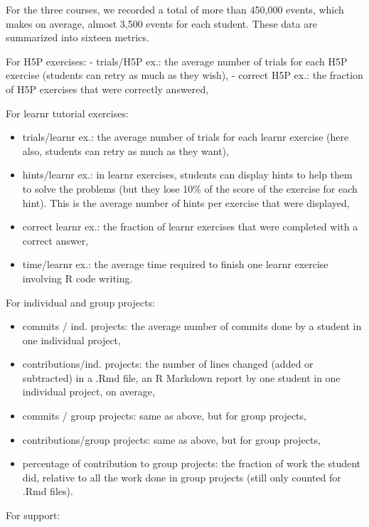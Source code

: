 \documentclass[
]{article}
\providecommand{\tightlist}{%
  \setlength{\itemsep}{0pt}\setlength{\parskip}{0pt}}
\begin{document}
For the three courses, we recorded a total of more than 450,000 events,
which makes on average, almost 3,500 events for each student. These data
are summarized into sixteen metrics.

For H5P exercises: - trials/H5P ex.: the average number of trials for
each H5P exercise (students can retry as much as they wish), - correct
H5P ex.: the fraction of H5P exercises that were correctly answered,

For learnr tutorial exercises:

\begin{itemize}
\tightlist
\item
  trials/learnr ex.: the average number of trials for each learnr
  exercise (here also, students can retry as much as they want),
\item
  hints/learnr ex.: in learnr exercises, students can display hints to
  help them to solve the problems (but they lose 10\% of the score of
  the exercise for each hint). This is the average number of hints per
  exercise that were displayed,
\item
  correct learnr ex.: the fraction of learnr exercises that were
  completed with a correct answer,
\item
  time/learnr ex.: the average time required to finish one learnr
  exercise involving R code writing.
\end{itemize}

For individual and group projects:

\begin{itemize}
\tightlist
\item
  commits / ind. projects: the average number of commits done by a
  student in one individual project,
\item
  contributions/ind. projects: the number of lines changed (added or
  subtracted) in a .Rmd file, an R Markdown report by one student in one
  individual project, on average,
\item
  commits / group projects: same as above, but for group projects,
\item
  contributions/group projects: same as above, but for group projects,
\item
  percentage of contribution to group projects: the fraction of work the
  student did, relative to all the work done in group projects (still
  only counted for .Rmd files).
\end{itemize}

For support:
\end{document}
